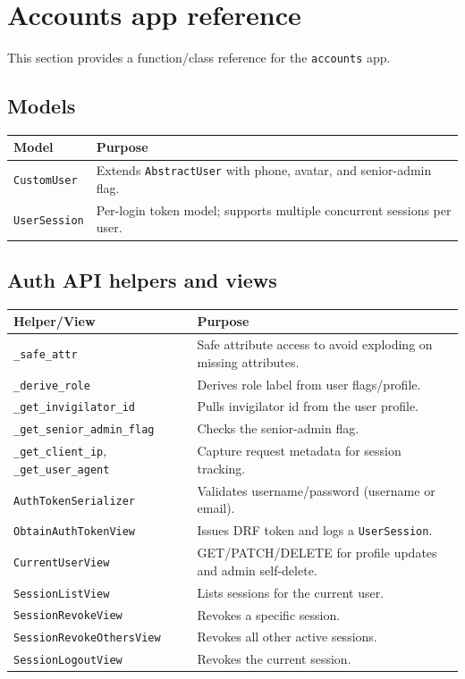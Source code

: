 \section{Accounts app reference}
\label{sec:accounts:ref}

This section provides a function/class reference for the \texttt{accounts} app.

\subsection{Models}
\label{subsec:accounts:ref:models}

\begin{longtable}{p{}p{}}
\toprule
\textbf{Model} & \textbf{Purpose} \\
\midrule
\texttt{CustomUser} & Extends \texttt{AbstractUser} with phone, avatar, and senior-admin flag. \\
\texttt{UserSession} & Per-login token model; supports multiple concurrent sessions per user. \\
\bottomrule
\end{longtable}

\subsection{Auth API helpers and views}
\label{subsec:accounts:ref:api}

\begin{longtable}{p{}p{}}
\toprule
\textbf{Helper/View} & \textbf{Purpose} \\
\midrule
\texttt{\_safe\_attr} & Safe attribute access to avoid exploding on missing attributes. \\
\texttt{\_derive\_role} & Derives role label from user flags/profile. \\
\texttt{\_get\_invigilator\_id} & Pulls invigilator id from the user profile. \\
\texttt{\_get\_senior\_admin\_flag} & Checks the senior-admin flag. \\
\texttt{\_get\_client\_ip}, \texttt{\_get\_user\_agent} & Capture request metadata for session tracking. \\
\texttt{AuthTokenSerializer} & Validates username/password (username or email). \\
\texttt{ObtainAuthTokenView} & Issues DRF token and logs a \texttt{UserSession}. \\
\texttt{CurrentUserView} & GET/PATCH/DELETE for profile updates and admin self-delete. \\
\texttt{SessionListView} & Lists sessions for the current user. \\
\texttt{SessionRevokeView} & Revokes a specific session. \\
\texttt{SessionRevokeOthersView} & Revokes all other active sessions. \\
\texttt{SessionLogoutView} & Revokes the current session. \\
\bottomrule
\end{longtable}

